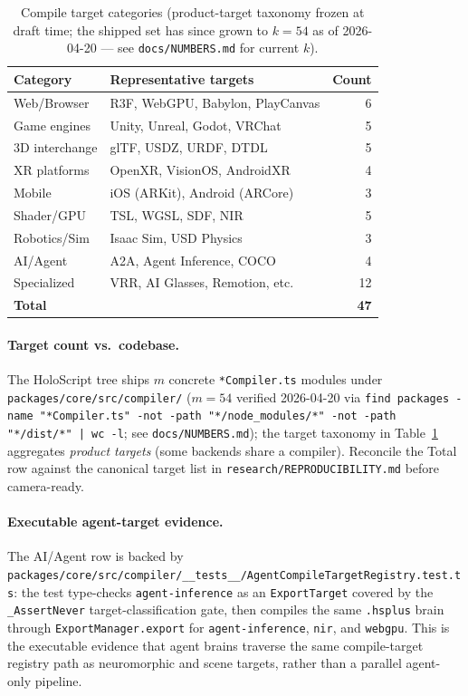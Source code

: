 \documentclass[sigconf,nonacm]{acmart}
\begin{document}
\begin{table}[t]
\centering
\caption{Compile target categories (product-target taxonomy frozen at draft time; the shipped set has since grown to $k=54$ as of 2026-04-20 --- see \texttt{docs/NUMBERS.md} for current $k$).}
\label{tab:targets}
\begin{tabular}{@{}llr@{}}
\toprule
Category & Representative targets & Count \\
\midrule
Web/Browser      & R3F, WebGPU, Babylon, PlayCanvas & 6 \\
Game engines     & Unity, Unreal, Godot, VRChat     & 5 \\
3D interchange   & glTF, USDZ, URDF, DTDL          & 5 \\
XR platforms     & OpenXR, VisionOS, AndroidXR      & 4 \\
Mobile           & iOS (ARKit), Android (ARCore)    & 3 \\
Shader/GPU       & TSL, WGSL, SDF, NIR              & 5 \\
Robotics/Sim     & Isaac Sim, USD Physics           & 3 \\
AI/Agent         & A2A, Agent Inference, COCO       & 4 \\
Specialized      & VRR, AI Glasses, Remotion, etc.  & 12 \\
\midrule
\textbf{Total}   &                                  & \textbf{47} \\
\bottomrule
\end{tabular}
\end{table}

\paragraph{Target count vs.\ codebase.}
The HoloScript tree ships $m$ concrete \texttt{*Compiler.ts} modules under
\texttt{packages/core/src/compiler/} ($m=54$ verified 2026-04-20 via
\texttt{find packages -name "*Compiler.ts" -not -path "*/node_modules/*" -not -path "*/dist/*" | wc -l};
see \texttt{docs/NUMBERS.md}); the target taxonomy in
Table~\ref{tab:targets} aggregates \emph{product targets} (some backends
share a compiler). Reconcile the Total row against the canonical
target list in \texttt{research/REPRODUCIBILITY.md} before camera-ready.

\paragraph{Executable agent-target evidence.}
The AI/Agent row is backed by
\texttt{packages/core/src/compiler/\_\_tests\_\_/AgentCompileTargetRegistry.test.ts}:
the test type-checks \texttt{agent-inference} as an \texttt{ExportTarget}
covered by the \texttt{\_AssertNever} target-classification gate, then
compiles the same \texttt{.hsplus} brain through
\texttt{ExportManager.export} for \texttt{agent-inference}, \texttt{nir},
and \texttt{webgpu}.  This is the executable evidence that agent brains
traverse the same compile-target registry path as neuromorphic and scene
targets, rather than a parallel agent-only pipeline.
\end{document}
